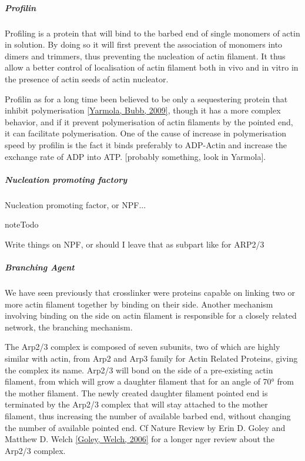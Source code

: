\documentclass[A4paperpaper,11pt,english]{sphinxmanual}
\begin{document}
\subparagraph{Profilin}
\label{parts/part1:profilin}
Profiling is a protein that will bind to the barbed end of single monomers of
actin in solution.  By doing so it will first prevent the association of
monomers into dimers and trimmers, thus preventing the nucleation of actin
filament. It thus allow a better control of localisation of actin filament
both in vivo and in vitro in the presence of actin seeds of actin nucleator.

Profilin as for a long time been believed to be only a sequestering protein
that inhibit polymerisation {\hyperref[bibitem:yarmola2009]{{[}Yarmola, Bubb,  2009{]}}}, though it has a more complex
behavior, and if it prevent polymerisation of actin filaments by the pointed
end, it can facilitate polymerisation. One of the cause of increase in
polymerisation speed by profilin is the fact it binds preferably to ADP-Actin
and increase the exchange rate of ADP into ATP. {[}probably something, look in Yarmola{]}.


\subparagraph{Nucleation promoting factory}
\label{parts/part1:nucleation-promoting-factory}
Nucleation promoting factor, or NPF...

\begin{notice}{note}{Todo}

Write things on NPF, or should  I leave that as subpart like for ARP2/3
\end{notice}


\subparagraph{Branching Agent}
\label{parts/part1:branching-agent}
We have seen previously that crosslinker were proteins capable on linking two
or more actin filament together by binding on their side. Another mechanism
involving binding on the side on actin filament is responsible for a closely
related network, the branching mechanism.

The Arp2/3 complex is composed of seven subunits, two of which are highly
similar with actin, from Arp2 and Arp3 family for Actin Related Proteins,
giving the complex its name. Arp2/3 will bond on the side of a pre-existing
actin filament, from which will grow a daughter filament that for an angle of
70° from the mother filament. The newly created daughter filament pointed end
is terminated by the Arp2/3 complex that will stay attached to the mother
filament, thus increasing the number of available barbed end, without changing
the number of available pointed end. Cf Nature Review by Erin D. Goley and
Matthew D. Welch {\hyperref[bibitem:goley2006]{{[}Goley, Welch,  2006{]}}} for  a longer nger review about the Arp2/3
complex.
\end{document}
